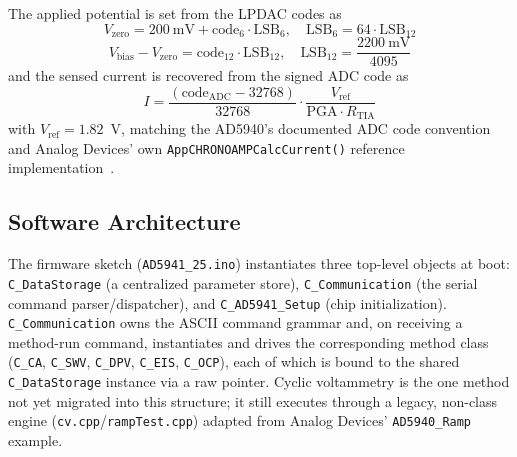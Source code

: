 \documentclass[preprint,12pt]{elsarticle}
\begin{document}
The applied potential is set from the LPDAC codes as
\begin{equation}
V_{\text{zero}} = 200~\text{mV} + \text{code}_{6} \cdot \text{LSB}_{6}, \quad \text{LSB}_{6} = 64\cdot\text{LSB}_{12}
\label{eq:vzero}
\end{equation}
\begin{equation}
V_{\text{bias}} - V_{\text{zero}} = \text{code}_{12} \cdot \text{LSB}_{12}, \quad \text{LSB}_{12} = \frac{2200~\text{mV}}{4095}
\label{eq:vbias}
\end{equation}
and the sensed current is recovered from the signed ADC code as
\begin{equation}
I = \frac{(\text{code}_{\text{ADC}} - 32768)}{32768}\cdot \frac{V_{\text{ref}}}{\text{PGA}\cdot R_{\text{TIA}}}
\label{eq:current}
\end{equation}
with $V_{\text{ref}} = 1.82$~V, matching the AD5940's documented ADC code convention and Analog Devices' own \texttt{AppCHRONOAMPCalcCurrent()} reference implementation~\cite{ref:ad5940examples}.

\subsection{Software Architecture}
The firmware sketch (\texttt{AD5941\_25.ino}) instantiates three top-level objects at boot: \texttt{C\_DataStorage} (a centralized parameter store), \texttt{C\_Communication} (the serial command parser/dispatcher), and \texttt{C\_AD5941\_Setup} (chip initialization). \texttt{C\_Communication} owns the ASCII command grammar and, on receiving a method-run command, instantiates and drives the corresponding method class (\texttt{C\_CA}, \texttt{C\_SWV}, \texttt{C\_DPV}, \texttt{C\_EIS}, \texttt{C\_OCP}), each of which is bound to the shared \texttt{C\_DataStorage} instance via a raw pointer. Cyclic voltammetry is the one method not yet migrated into this structure; it still executes through a legacy, non-class engine (\texttt{cv.cpp}/\texttt{rampTest.cpp}) adapted from Analog Devices' \texttt{AD5940\_Ramp} example.
\end{document}
